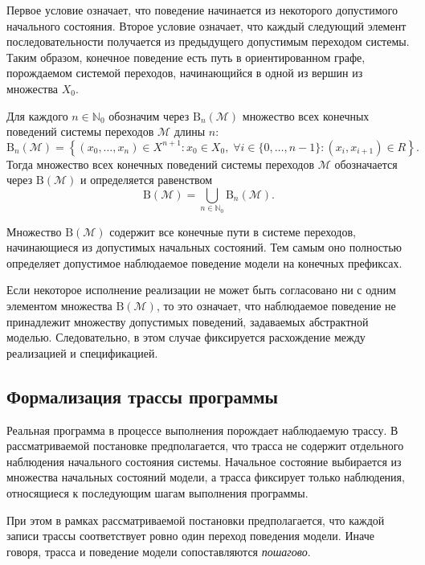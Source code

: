 Первое условие означает, что поведение начинается из некоторого допустимого
начального состояния. Второе условие означает, что каждый следующий элемент
последовательности получается из предыдущего допустимым переходом системы.
Таким образом, конечное поведение есть путь в ориентированном графе,
порождаемом системой переходов, начинающийся в одной из вершин из множества
$X_0$.

\begin{definition}
Для каждого $n \in \mathbb{N}_0$ обозначим через $\mathrm{B}_n(\mathcal{M})$
множество всех конечных поведений системы переходов $\mathcal{M}$ длины $n$:
\[
\mathrm{B}_n(\mathcal{M})
=
\left\{
(x_0,\dots,x_n) \in X^{n+1}
:
x_0 \in X_0,\;
\forall i \in \{0,\dots,n-1\} : (x_i,x_{i+1}) \in R
\right\}.
\]
Тогда множество всех конечных поведений системы переходов $\mathcal{M}$
обозначается через $\mathrm{B}(\mathcal{M})$ и определяется равенством
\begin{equation}\label{f3}
\mathrm{B}(\mathcal{M})
=
\bigcup_{n \in \mathbb{N}_0} \mathrm{B}_n(\mathcal{M}).
\end{equation}
\end{definition}

Множество $\mathrm{B}(\mathcal{M})$ содержит все конечные пути в системе
переходов, начинающиеся из допустимых начальных состояний. Тем самым оно
полностью определяет допустимое наблюдаемое поведение модели на конечных
префиксах.

Если некоторое исполнение реализации не может быть согласовано ни с одним
элементом множества $\mathrm{B}(\mathcal{M})$, то это означает, что наблюдаемое
поведение не принадлежит множеству допустимых поведений, задаваемых абстрактной
моделью. Следовательно, в этом случае фиксируется расхождение между реализацией
и спецификацией.

\subsection{Формализация трассы программы}

Реальная программа в процессе выполнения порождает наблюдаемую трассу. В
рассматриваемой постановке предполагается, что трасса не содержит отдельного
наблюдения начального состояния системы. Начальное состояние выбирается из
множества начальных состояний модели, а трасса фиксирует только наблюдения,
относящиеся к последующим шагам выполнения программы.

При этом в рамках рассматриваемой постановки предполагается, что каждой записи
трассы соответствует ровно один переход поведения модели. Иначе говоря, трасса
и поведение модели сопоставляются \emph{пошагово}.

